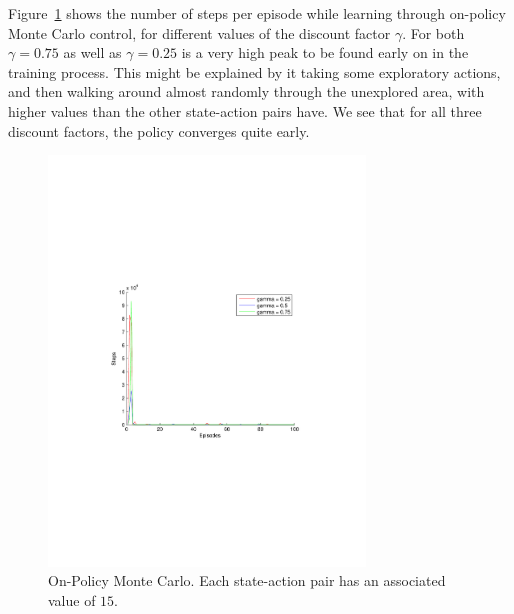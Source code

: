 \documentclass[a4paper,11pt]{article}
\begin{document}
Figure~\ref{onmc} shows the number of steps per episode while learning through on-policy Monte Carlo control, for different values of the discount factor $\gamma$.  For both $\gamma = 0.75$ as well as $\gamma = 0.25$ is a very high peak to be found early on in the training process.  This might be explained by it taking some exploratory actions, and then walking around almost randomly through the unexplored area, with higher values than the other state-action pairs have.  We see that for all three discount factors, the policy converges quite early.

\begin{figure}[t!]
  \centering
    \includegraphics[trim=4cm 8.5cm 4cm 8.5cm,clip,width=0.75\textwidth]{figures/onmc.pdf}
    \caption{On-Policy Monte Carlo.  Each state-action pair has an associated value of $15$.}
     \label{onmc}
\end{figure}
\newpage
\end{document}

